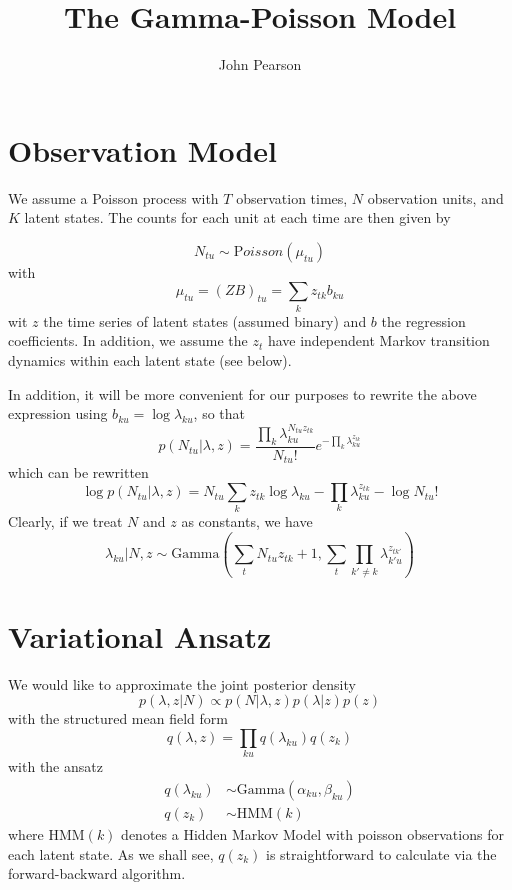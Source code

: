 \documentclass[11pt]{article}
\begin{document}
\title{The Gamma-Poisson Model}
\author{John Pearson}
\maketitle

\section{Observation Model}
We assume a Poisson process with $T$ observation times, $N$ observation units, and $K$ latent states. The counts for each unit at each time are then given by 

\begin{equation}
    N_{tu} \sim {\mathrm Poisson}(\mu_{tu})    
\end{equation}
with 
\begin{equation}
   \mu_{tu} = (ZB)_{tu} = \sum_k z_{tk} b_{ku} 
\end{equation}
wit $z$ the time series of latent states (assumed binary) and $b$ the regression coefficients. In addition, we assume the $z_t$ have independent Markov transition dynamics within each latent state (see below).

In addition, it will be more convenient for our purposes to rewrite the above expression using $b_{ku} = \log \lambda_{ku}$, so that 
\begin{equation}
    p(N_{tu}|\lambda, z) = \frac{\prod_k \lambda_{ku}^{N_{tu} z_{tk}}}{N_{tu}!} e^{-\prod_k \lambda_{ku}^{z_{tk}}}
\end{equation}
which can be rewritten
\begin{equation}
    \log p(N_{tu}|\lambda, z) = N_{tu} \sum_k z_{tk} \log \lambda_{ku} - \prod_k \lambda_{ku}^{z_{tk}} - \log N_{tu}!
\end{equation}
Clearly, if we treat $N$ and $z$ as constants, we have
\begin{equation}
    \lambda_{ku}|N, z \sim \mathrm{Gamma}(\sum_t N_{tu}z_{tk} + 1, \sum_t\prod_{k'\neq k} \lambda_{k'u}^{z_{tk'}})
\end{equation}

\section{Variational Ansatz}
We would like to approximate the joint posterior density
\begin{equation}
    p(\lambda, z|N) \propto p(N|\lambda, z) p(\lambda|z) p(z)
\end{equation}
with the structured mean field form
\begin{equation}
     q(\lambda, z) = \prod_{ku} q(\lambda_{ku})q(z_k)
\end{equation} 
with the ansatz
\begin{align} 
    q(\lambda_{ku}) &\sim \mathrm{Gamma}(\alpha_{ku}, \beta_{ku}) \\
    q(z_k) &\sim \mathrm{HMM}(k)
\end{align}
where $\mathrm{HMM}(k)$ denotes a Hidden Markov Model with poisson observations for each latent state. As we shall see, $q(z_k)$ is straightforward to calculate via the forward-backward algorithm.
\end{document}
